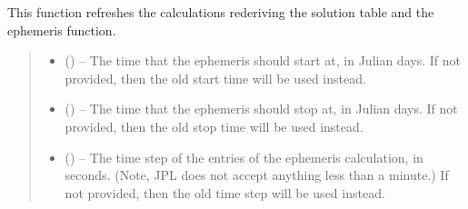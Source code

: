 \documentclass[letterpaper,11pt,english]{sphinxmanual}
\begin{document}
\begin{savenotes}
\begin{fulllineitems}

\begin{savenotes}\begin{fulllineitems}
\label{\detokenize{code/opihiexarata.ephemeris.jplhorizons:opihiexarata.ephemeris.jplhorizons.JPLHorizonsWebAPIEngine._refresh_ephemeris}}
\pysigstartsignatures
{}
\pysigstopsignatures
\sphinxAtStartPar
This function refreshes the calculations rederiving the solution
table and the ephemeris function.
\begin{quote}\begin{description}
\begin{itemize}
\item {} 
\sphinxAtStartPar
{} (\sphinxstyleliteralemphasis{\sphinxupquote{, }}) – The time that the ephemeris should start at, in Julian days. If
not provided, then the old start time will be used instead.

\item {} 
\sphinxAtStartPar
{} (\sphinxstyleliteralemphasis{\sphinxupquote{, }}) – The time that the ephemeris should stop at, in Julian days. If
not provided, then the old stop time will be used instead.

\item {} 
\sphinxAtStartPar
{} (\sphinxstyleliteralemphasis{\sphinxupquote{, }}) – The time step of the entries of the ephemeris calculation, in
seconds. (Note, JPL does not accept anything less than a minute.)
If not provided, then the old time step will be used instead.


\end{itemize}
\end{description}
\end{quote}
\end{fulllineitems}
\end{savenotes}
\end{fulllineitems}
\end{savenotes}
\end{document}
